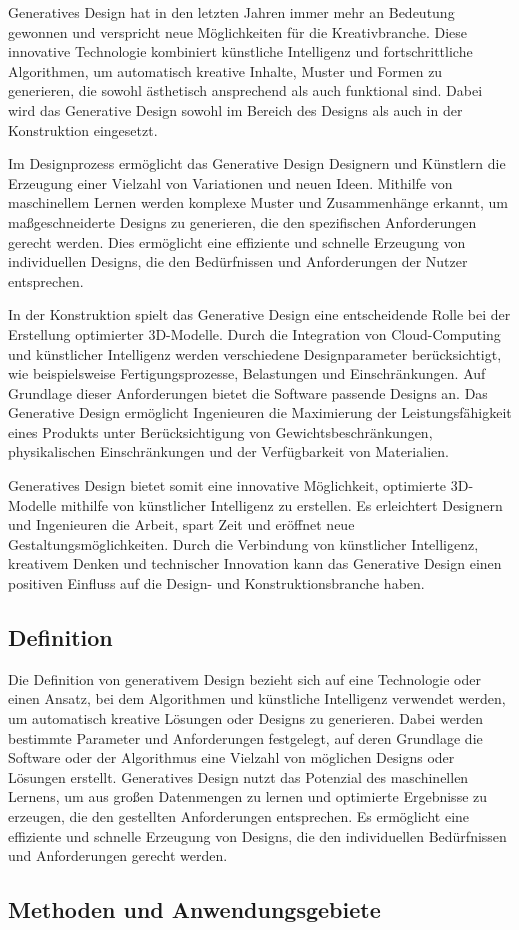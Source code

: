 Generatives Design hat in den letzten Jahren immer mehr an Bedeutung gewonnen und verspricht neue Möglichkeiten für die Kreativbranche. Diese innovative Technologie kombiniert künstliche Intelligenz und fortschrittliche Algorithmen, um automatisch kreative Inhalte, Muster und Formen zu generieren, die sowohl ästhetisch ansprechend als auch funktional sind. Dabei wird das Generative Design sowohl im Bereich des Designs als auch in der Konstruktion eingesetzt.

Im Designprozess ermöglicht das Generative Design Designern und Künstlern die Erzeugung einer Vielzahl von Variationen und neuen Ideen. Mithilfe von maschinellem Lernen werden komplexe Muster und Zusammenhänge erkannt, um maßgeschneiderte Designs zu generieren, die den spezifischen Anforderungen gerecht werden. Dies ermöglicht eine effiziente und schnelle Erzeugung von individuellen Designs, die den Bedürfnissen und Anforderungen der Nutzer entsprechen.

In der Konstruktion spielt das Generative Design eine entscheidende Rolle bei der Erstellung optimierter 3D-Modelle. Durch die Integration von Cloud-Computing und künstlicher Intelligenz werden verschiedene Designparameter berücksichtigt, wie beispielsweise Fertigungsprozesse, Belastungen und Einschränkungen. Auf Grundlage dieser Anforderungen bietet die Software passende Designs an. Das Generative Design ermöglicht Ingenieuren die Maximierung der Leistungsfähigkeit eines Produkts unter Berücksichtigung von Gewichtsbeschränkungen, physikalischen Einschränkungen und der Verfügbarkeit von Materialien.

Generatives Design bietet somit eine innovative Möglichkeit, optimierte 3D-Modelle mithilfe von künstlicher Intelligenz zu erstellen. Es erleichtert Designern und Ingenieuren die Arbeit, spart Zeit und eröffnet neue Gestaltungsmöglichkeiten. Durch die Verbindung von künstlicher Intelligenz, kreativem Denken und technischer Innovation kann das Generative Design einen positiven Einfluss auf die Design- und Konstruktionsbranche haben.

\subsection*{Definition}
Die Definition von generativem Design bezieht sich auf eine Technologie oder einen Ansatz, bei dem Algorithmen und künstliche Intelligenz verwendet werden, um automatisch kreative Lösungen oder Designs zu generieren. Dabei werden bestimmte Parameter und Anforderungen festgelegt, auf deren Grundlage die Software oder der Algorithmus eine Vielzahl von möglichen Designs oder Lösungen erstellt. Generatives Design nutzt das Potenzial des maschinellen Lernens, um aus großen Datenmengen zu lernen und optimierte Ergebnisse zu erzeugen, die den gestellten Anforderungen entsprechen. Es ermöglicht eine effiziente und schnelle Erzeugung von Designs, die den individuellen Bedürfnissen und Anforderungen gerecht werden.

\subsection*{Methoden und Anwendungsgebiete}
